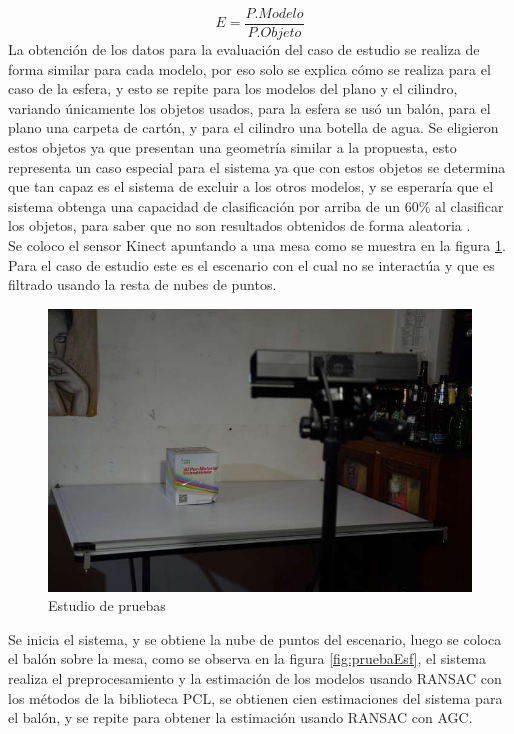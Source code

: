 		 \begin{equation}
		 \label{eq:exactitud}
		 E=\frac{P.Modelo}{P.Objeto}
		 \end{equation}
	La obtención de los datos para la evaluación del caso de estudio se realiza de forma similar para cada modelo, por eso solo se explica cómo se realiza para el caso de la \gls{esfera}, y esto se repite para los modelos del \gls{plano} y el \gls{cilindro}, variando únicamente los objetos usados, para la esfera se usó un balón, para el plano una carpeta de cartón, y para el cilindro una botella de agua. Se eligieron estos objetos ya que presentan una geometría similar a la propuesta, esto representa un caso especial para el sistema ya que con estos objetos se determina que tan capaz es el sistema de excluir a los otros modelos, y se esperaría que el sistema obtenga una capacidad de clasificación por arriba de un $60\%$ al clasificar los objetos, para saber que no son resultados obtenidos de forma aleatoria .\\
	
	Se coloco el sensor Kinect apuntando a una mesa como se muestra en la figura \ref{fig:casoDeESt}. Para el caso de estudio este es el escenario con el cual no se interactúa y que es filtrado usando la resta de nubes de puntos.\\
	
	\begin{figure}[!htb] 
		\centering
		\includegraphics[width=1\textwidth]{03Resultados/imagenes/casoDeEstudio.JPG}
		\caption{Estudio de pruebas} 
		\label{fig:casoDeESt}
	\end{figure}
	
	
	 Se inicia el sistema, y se obtiene la nube de puntos del escenario, luego se coloca el balón sobre la mesa, como se observa en la figura \ref{fig:pruebaEsf}, el sistema realiza el preprocesamiento y la estimación de los modelos usando RANSAC con los métodos de la biblioteca PCL, se obtienen cien estimaciones del sistema para el balón, y se repite para obtener la estimación usando RANSAC con AGC.\\
	
